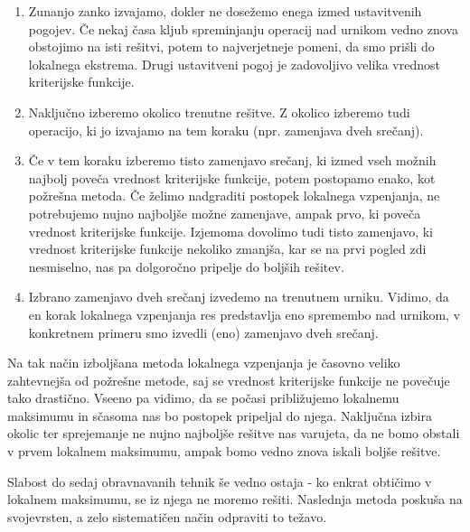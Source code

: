 \documentclass[10pt,a4paper]{article}
\begin{document}
\begin{enumerate}
  \item Zunanjo zanko izvajamo, dokler ne dosežemo enega izmed ustavitvenih pogojev.
   Če nekaj časa kljub spreminjanju operacij nad urnikom vedno znova obstojimo na isti
   rešitvi, potem to najverjetneje pomeni, da smo prišli do lokalnega ekstrema. Drugi
   ustavitveni pogoj je zadovoljivo velika vrednost kriterijske funkcije.

 \item  Naključno izberemo okolico trenutne rešitve. Z okolico izberemo tudi operacijo,
   ki jo izvajamo na tem koraku (npr. zamenjava dveh srečanj).

 \item  Če v tem koraku izberemo tisto zamenjavo srečanj, ki izmed vseh možnih najbolj
   poveča vrednost kriterijske funkcije, potem postopamo enako, kot požrešna metoda. Če
   želimo nadgraditi postopek lokalnega vzpenjanja, ne potrebujemo nujno najboljše možne
   zamenjave, ampak prvo, ki poveča vrednost kriterijske funkcije. Izjemoma dovolimo tudi
   tisto zamenjavo, ki vrednost kriterijske funkcije nekoliko zmanjša, kar se na prvi
   pogled zdi nesmiselno, nas pa dolgoročno pripelje do boljših rešitev.

  \item Izbrano zamenjavo dveh srečanj izvedemo na trenutnem urniku. Vidimo, da en korak
   lokalnega vzpenjanja res predstavlja eno spremembo nad urnikom, v konkretnem primeru
   smo izvedli (eno) zamenjavo dveh srečanj.
   
\end{enumerate}

Na tak način izboljšana metoda lokalnega vzpenjanja je časovno veliko zahtevnejša od
požrešne metode, saj se vrednost kriterijske funkcije ne povečuje tako drastično. Vseeno
pa vidimo, da se počasi približujemo lokalnemu maksimumu in sčasoma nas bo postopek
pripeljal do njega. Naključna izbira okolic ter sprejemanje ne nujno najboljše rešitve
nas varujeta, da ne bomo obstali v prvem lokalnem maksimumu, ampak bomo vedno znova
iskali boljše rešitve.

Slabost do sedaj obravnavanih tehnik še vedno ostaja - ko enkrat obtičimo v lokalnem
maksimumu, se iz njega ne moremo rešiti. Naslednja metoda poskuša na svojevrsten, a zelo
sistematičen način odpraviti to težavo.
\end{document}
